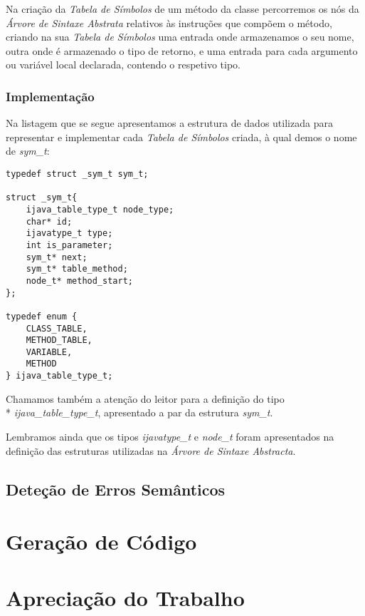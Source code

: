 \documentclass[11pt,a4paper]{article}
\begin{document}
	Na criação da \emph{Tabela de Símbolos} de um método da classe percorremos os nós da \emph{Árvore de Sintaxe Abstrata} relativos às instruções que compõem o método, criando na sua \emph{Tabela de Símbolos} uma entrada onde armazenamos o seu nome, outra onde é armazenado o tipo de retorno, e uma entrada para cada argumento ou variável local declarada, contendo o respetivo tipo.
	
	\subsubsection{Implementação}
	
	Na listagem que se segue apresentamos a estrutura de dados utilizada para representar e implementar cada \emph{Tabela de Símbolos} criada, à qual demos o nome de \emph{sym\_t}:
	
	\begin{lstlisting}
typedef struct _sym_t sym_t;	

struct _sym_t{
	ijava_table_type_t node_type;
	char* id;
	ijavatype_t type;
	int is_parameter;
	sym_t* next;
	sym_t* table_method;
	node_t* method_start;
};

typedef enum {
	CLASS_TABLE,
	METHOD_TABLE,
	VARIABLE,
	METHOD
} ijava_table_type_t;
	\end{lstlisting}
	
	Chamamos também a atenção do leitor para a definição do tipo \\* \emph{ijava\_table\_type\_t}, apresentado a par da estrutura \emph{sym\_t}.
	
	Lembramos ainda que os tipos \emph{ijavatype\_t} e \emph{node\_t} foram apresentados na definição das estruturas utilizadas na \emph{Árvore de Sintaxe Abstracta}.
	
	\pagebreak
	
	\subsection{Deteção de Erros Semânticos}
	
	\pagebreak
	
\section{Geração de Código}

\pagebreak

\section{Apreciação do Trabalho}
\end{document}

